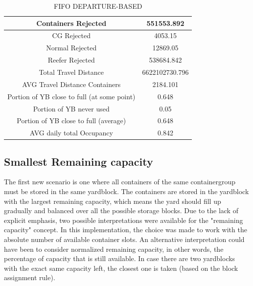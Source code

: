 \documentclass{article}
\begin{document}
\begin{table}[h]
    \centering
    \begin{tabular}{|c|c|}
        \hline
        Containers Rejected                         & 551553.892     \\ \hline
        CG Rejected                                 & 4053.15        \\ \hline
        Normal Rejected                             & 12869.05       \\ \hline
        Reefer Rejected                             & 538684.842     \\ \hline
        Total Travel Distance                       & 6622102730.796 \\ \hline
        AVG Travel Distance Containers              & 2184.101       \\ \hline
        Portion of YB close to full (at some point) & 0.648          \\ \hline
        Portion of YB never used                    & 0.05           \\ \hline
        Portion of YB close to full (average)       & 0.648          \\ \hline
        AVG daily total Occupancy                   & 0.842          \\ \hline
    \end{tabular}
    \caption{FIFO DEPARTURE-BASED}
\end{table}

\subsection{Smallest Remaining capacity}
The first new scenario is one where all containers of the same containergroup
must be stored in the same yardblock. The containers are stored in the
yardblock with the largest remaining capacity, which means the yard should fill
up gradually and balanced over all the possible storage blocks. Due to the lack
of explicit emphasis, two possible interpretations were available for the
"remaining capacity" concept. In this implementation, the choice was made to
work with the absolute number of available container slots. An alternative
interpretation could have been to consider normalized remaining capacity, in
other words, the percentage of capacity that is still available. In case there
are two yardblocks with the exact same capacity left, the closest one is taken
(based on the block assignment rule).
\end{document}
